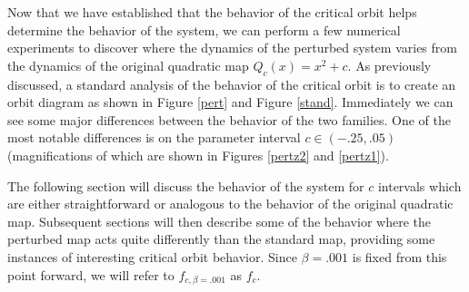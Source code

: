 		Now that we have established that the behavior of the critical orbit helps determine the behavior of the system, we can perform a few numerical experiments to discover where the dynamics of the perturbed system varies from the dynamics of the original quadratic map $Q_c (x) = x^2 + c$. As previously discussed, a standard analysis of the behavior of the critical orbit is to create an orbit diagram as shown in Figure \ref{pert} and Figure \ref{stand}. Immediately we can see some major differences between the behavior of the two families. One of the most notable differences is on the parameter interval $c\in (-.25, .05)$ (magnifications of which are shown in Figures \ref{pertz2} and \ref{pertz1}).

		The following section will discuss the behavior of the system for $c$ intervals which are either straightforward or analogous to the behavior of the original quadratic map. Subsequent sections will then describe some of the behavior where the perturbed  map acts quite differently than the standard map, providing some instances of interesting critical orbit behavior. Since $\beta = .001$ is fixed from this point forward, we will refer to $f_{c, \beta = .001}$ as $f_{c}$.

